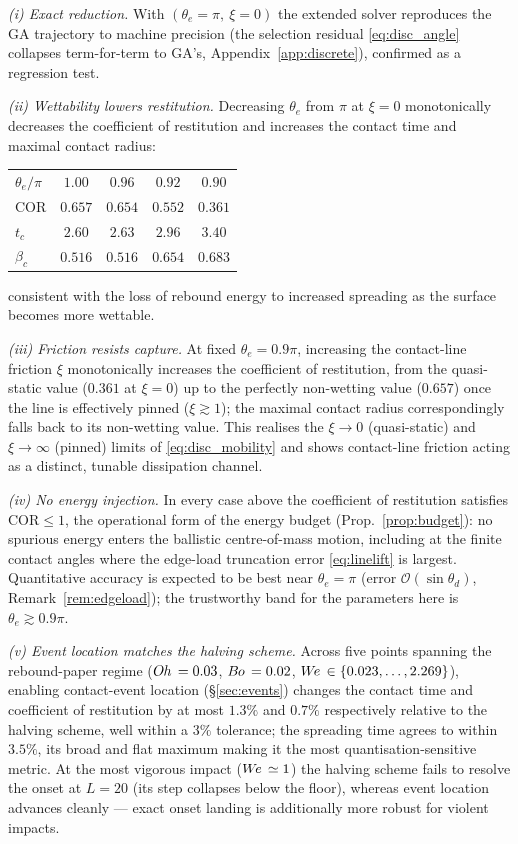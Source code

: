 \documentclass{jfm}
\newcommand{\We}{W\kern-0.15em e\,}
\newcommand{\Bo}{B\kern-0.05em o\,}
\newcommand{\Oh}{O\kern-0.05em h\,}
\begin{document}
\emph{(i) Exact reduction.} With $(\theta_e=\pi,\ \xi=0)$ the extended solver reproduces
the GA trajectory to machine precision (the selection residual \eqref{eq:disc_angle}
collapses term-for-term to GA's, Appendix~\ref{app:discrete}), confirmed as a
regression test.

\emph{(ii) Wettability lowers restitution.} Decreasing $\theta_e$ from $\pi$ at $\xi=0$
monotonically decreases the coefficient of restitution and increases the contact time
and maximal contact radius:
\begin{center}
\begin{tabular}{lcccc}
$\theta_e/\pi$ & $1.00$ & $0.96$ & $0.92$ & $0.90$\\[2pt]
COR            & $0.657$ & $0.654$ & $0.552$ & $0.361$\\
$t_c$          & $2.60$ & $2.63$ & $2.96$ & $3.40$\\
$\beta_c$      & $0.516$ & $0.516$ & $0.654$ & $0.683$
\end{tabular}
\end{center}
consistent with the loss of rebound energy to increased spreading as the surface becomes
more wettable.

\emph{(iii) Friction resists capture.} At fixed $\theta_e=0.9\pi$, increasing the
contact-line friction $\xi$ monotonically increases the coefficient of restitution,
from the quasi-static value ($0.361$ at $\xi=0$) up to the perfectly non-wetting value
($0.657$) once the line is effectively pinned ($\xi\gtrsim1$); the maximal contact
radius correspondingly falls back to its non-wetting value. This realises the
$\xi\to0$ (quasi-static) and $\xi\to\infty$ (pinned) limits of \eqref{eq:disc_mobility}
and shows contact-line friction acting as a distinct, tunable dissipation channel.

\emph{(iv) No energy injection.} In every case above the coefficient of restitution
satisfies $\text{COR}\le1$, the operational form of the energy budget
(Prop.~\ref{prop:budget}): no spurious energy enters the ballistic centre-of-mass
motion, including at the finite contact angles where the edge-load truncation error
\eqref{eq:linelift} is largest. Quantitative accuracy is expected to be best near
$\theta_e=\pi$ (error $\mathcal O(\sin\theta_d)$, Remark~\ref{rem:edgeload}); the
trustworthy band for the parameters here is $\theta_e\gtrsim0.9\pi$.

\emph{(v) Event location matches the halving scheme.} Across five points spanning the
rebound-paper regime ($\Oh=0.03$, $\Bo=0.02$, $\We\in\{0.023,\dots,2.269\}$), enabling
contact-event location (\S\ref{sec:events}) changes the contact time and coefficient of
restitution by at most $1.3\%$ and $0.7\%$ respectively relative to the halving scheme,
well within a $3\%$ tolerance; the spreading time agrees to within $3.5\%$, its broad and
flat maximum making it the most quantisation-sensitive metric. At the most vigorous
impact ($\We\simeq1$) the halving scheme fails to resolve the onset at $L=20$ (its step
collapses below the floor), whereas event location advances cleanly --- exact onset
landing is additionally more robust for violent impacts.
\end{document}
